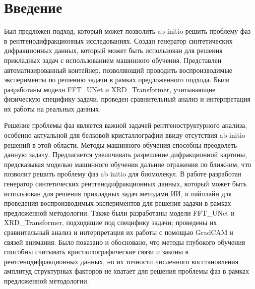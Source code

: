 \section*{Введение}

Был предложен подход, который может позволить ab initio решить проблему фаз в рентгенодифракционных исследованиях. Создан генератор синтетических дифракционных данных, который может быть использован для решения прикладных задач с использованием машинного обучения. Представлен автоматизированный контейнер, позволяющий проводить воспроизводимые эксперименты по решению задачи в рамках предложенного подхода. Были разработаны модели FFT\_UNet и XRD\_Transformer, учитывающие физическую специфику задачи, проведен сравнительный анализ и интерпретация их работы на реальных данных. 


Решение проблемы фаз является важной задачей рентгеноструктурного анализа, особенно актуальной для белковой кристаллографии ввиду отсутствия ab initio решений в этой области. Методы машинного обучения способны преодолеть данную задачу. Предлагается увеличивать разрешение дифракционной картины, предсказывая моделью машинного обучения дальние отражения по ближним, что позволит решить проблему фаз ab initio для биомолекул. В работе разработан генератор синтетических рентгенодифракционных данных, который может быть использован для решения прикладных задач методами ИИ, и пайплайн для проведения воспроизводимых экспериментов для решения задачи в рамках предложенной методологии. Также были разработаны модели FFT\_UNet и XRD\_Transformer, подходящие под специфику задачи; проведены их сравнительный анализ и интерпретация их работы с помощью GradCAM и связей внимания. Было показано и обосновано, что методы глубокого обучения способны считывать кристаллографические связи и законы в рентгенодифракционных данных, но их точности численного восстановления амплитуд структурных факторов не хватает для решения проблемы фаз в рамках предложенной методологии. 
